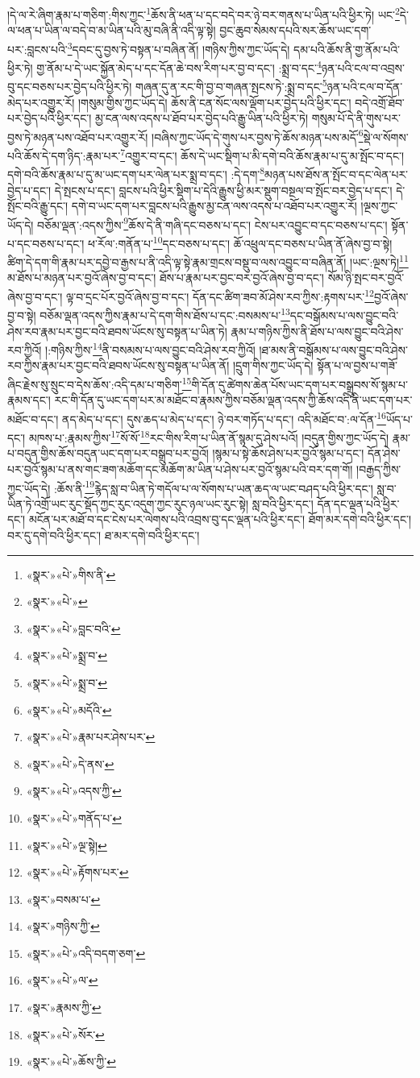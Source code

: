 །དེ་ལ་རེ་ཞིག་རྣམ་པ་གཅིག་:གིས་ཀྱང་\footnote{«སྣར་»«པེ་»གིས་ནི་}ཆོས་ནི་ཕན་པ་དང་བདེ་བར་ཉེ་བར་གནས་པ་ཡིན་པའི་ཕྱིར་ཏེ། ཡང་\footnote{«སྣར་»«པེ་»}དེ་ལ་ཕན་པ་ཡིན་ལ་བདེ་བ་མ་ཡིན་པའི་མུ་བཞི་ནི་འདི་ལྟ་སྟེ། བྱང་ཆུབ་སེམས་དཔའི་སར་ཆོས་ཡང་དག་པར་:བླངས་པའི་\footnote{«སྣར་»«པེ་»བླང་བའི་}དབང་དུ་བྱས་ཏེ་བསྟན་པ་བཞིན་ནོ། །གཉིས་ཀྱིས་ཀྱང་ཡོད་དེ། དམ་པའི་ཆོས་ནི་གྱ་ནོམ་པའི་ཕྱིར་ཏེ། གྱ་ནོམ་པ་དེ་ཡང་སྐྱོན་མེད་པ་དང་དོན་ཆེ་བས་རིག་པར་བྱ་བ་དང་། :སྨྲ་བ་དང་\footnote{«སྣར་»«པེ་»སྨྲ་བ་}ཉན་པའི་ངལ་བ་འབྲས་བུ་དང་བཅས་པར་བྱེད་པའི་ཕྱིར་ཏེ། གཞན་དུ་ན་རང་གི་བྱ་བ་གཞན་སྤངས་ཏེ་:སྨྲ་བ་དང་\footnote{«སྣར་»«པེ་»སྨྲ་བ་}ཉན་པའི་ངལ་བ་དོན་མེད་པར་འགྱུར་རོ། །གསུམ་གྱིས་ཀྱང་ཡོད་དེ། ཆོས་ནི་ངན་སོང་ལས་ལྡོག་པར་བྱེད་པའི་ཕྱིར་དང་། བདེ་འགྲོ་ཐོབ་པར་བྱེད་པའི་ཕྱིར་དང་། མྱ་ངན་ལས་འདས་པ་ཐོབ་པར་བྱེད་པའི་རྒྱུ་ཡིན་པའི་ཕྱིར་ཏེ། གསུམ་པོ་དེ་ནི་གུས་པར་བྱས་ཏེ་མཉན་པས་འཐོབ་པར་འགྱུར་རོ། །བཞིས་ཀྱང་ཡོད་དེ་གུས་པར་བྱས་ཏེ་ཆོས་མཉན་པས་མདོ་\footnote{«སྣར་»«པེ་»མདོའི་}སྡེ་ལ་སོགས་པའི་ཆོས་དེ་དག་ཉིད་:རྣམ་པར་\footnote{«སྣར་»«པེ་»རྣམ་པར་ཤེས་པར་}འགྱུར་བ་དང་། ཆོས་དེ་ཡང་སྡིག་པ་མི་དགེ་བའི་ཆོས་རྣམ་པ་དུ་མ་སྤོང་བ་དང་། དགེ་བའི་ཆོས་རྣམ་པ་དུ་མ་ཡང་དག་པར་ལེན་པར་སྨྲ་བ་དང་། :དེ་དག་\footnote{«སྣར་»«པེ་»དེ་ནས་}མཉན་པས་ཐོས་ན་སྤོང་བ་དང་ལེན་པར་བྱེད་པ་དང་། དེ་སྤངས་པ་དང་། བླངས་པའི་ཕྱིར་སྡིག་པ་དེའི་རྒྱུས་ཕྱི་མར་སྡུག་བསྔལ་བ་སྤོང་བར་བྱེད་པ་དང་། དེ་སྤོང་བའི་རྒྱུ་དང་། དགེ་བ་ཡང་དག་པར་བླངས་པའི་རྒྱུས་མྱ་ངན་ལས་འདས་པ་འཐོབ་པར་འགྱུར་རོ། །ལྔས་ཀྱང་ཡོད་དེ། བཅོམ་ལྡན་:འདས་ཀྱིས་\footnote{«སྣར་»«པེ་»འདས་ཀྱི་}ཆོས་དེ་ནི་གཞི་དང་བཅས་པ་དང་། ངེས་པར་འབྱུང་བ་དང་བཅས་པ་དང་། སྟོན་པ་དང་བཅས་པ་དང་། ཕ་རོལ་:གནོན་པ་\footnote{«སྣར་»«པེ་»གནོད་པ་}དང་བཅས་པ་དང་། ཆོ་འཕྲུལ་དང་བཅས་པ་ཡིན་ནོ་ཞེས་བྱ་བ་སྟེ། ཚིག་དེ་དག་གི་རྣམ་པར་དབྱེ་བ་རྒྱས་པ་ནི་འདི་ལྟ་སྟེ་རྣམ་གྲངས་བསྡུ་བ་ལས་འབྱུང་བ་བཞིན་ནོ། །ཡང་:ལྔས་ཏེ།\footnote{«སྣར་»«པེ་»ལྔ་སྟེ།} མ་ཐོས་པ་མཉན་པར་བྱའོ་ཞེས་བྱ་བ་དང་། ཐོས་པ་རྣམ་པར་བྱང་བར་བྱའོ་ཞེས་བྱ་བ་དང་། སོམ་ཉི་སྤང་བར་བྱའོ་ཞེས་བྱ་བ་དང་། ལྟ་བ་དྲང་པོར་བྱའོ་ཞེས་བྱ་བ་དང་། དོན་དང་ཚིག་ཟབ་མོ་ཤེས་རབ་ཀྱིས་:རྟགས་པར་\footnote{«སྣར་»«པེ་»རྟོགས་པར་}བྱའོ་ཞེས་བྱ་བ་སྟེ། བཅོམ་ལྡན་འདས་ཀྱིས་རྣམ་པ་དེ་དག་གིས་ཐོས་པ་དང་:བསམས་པ་\footnote{«སྣར་»བསམ་པ་}དང་བསྒོམས་པ་ལས་བྱུང་བའི་ཤེས་རབ་རྣམ་པར་བྱང་བའི་ཐབས་ཡོངས་སུ་བསྟན་པ་ཡིན་ཏེ། རྣམ་པ་གཉིས་ཀྱིས་ནི་ཐོས་པ་ལས་བྱུང་བའི་ཤེས་རབ་ཀྱིའོ། །:གཉིས་ཀྱིས་\footnote{«སྣར་»གཉིས་ཀྱི་}ནི་བསམས་པ་ལས་བྱུང་བའི་ཤེས་རབ་ཀྱིའོ། །ཐ་མས་ནི་བསྒོམས་པ་ལས་བྱུང་བའི་ཤེས་རབ་ཀྱིས་རྣམ་པར་བྱང་བའི་ཐབས་ཡོངས་སུ་བསྟན་པ་ཡིན་ནོ། །དྲུག་གིས་ཀྱང་ཡོད་དེ། སྟོན་པ་ལ་བྱས་པ་གཟོ་ཞིང་རྗེས་སུ་སྲུང་བ་དེས་ཆོས་:འདི་དམ་པ་གཅིག་\footnote{«སྣར་»«པེ་»འདི་བདག་ཅག་}གི་དོན་དུ་ཚེགས་ཆེན་པོས་ཡང་དག་པར་བསྒྲུབས་སོ་སྙམ་པ་རྣམས་དང་། རང་གི་དོན་དུ་ཡང་དག་པར་མ་མཐོང་བ་རྣམས་ཀྱིས་བཅོམ་ལྡན་འདས་ཀྱི་ཆོས་འདི་ནི་ཡང་དག་པར་མཐོང་བ་དང་། ནད་མེད་པ་དང་། དུས་ཆད་པ་མེད་པ་དང་། ཉེ་བར་གཏོད་པ་དང་། འདི་མཐོང་བ་:ལ་དོན་\footnote{«སྣར་»«པེ་»ལ་}ཡོད་པ་དང་། མཁས་པ་:རྣམས་ཀྱིས་\footnote{«སྣར་»རྣམས་ཀྱི་}སོ་སོ་\footnote{«སྣར་»«པེ་»སོར་}རང་གིས་རིག་པ་ཡིན་ནོ་སྙམ་དུ་ཤེས་པའོ། །བདུན་གྱིས་ཀྱང་ཡོད་དེ། རྣམ་པ་བདུན་གྱིས་ཆོས་བདུན་ཡང་དག་པར་བསྒྲུབ་པར་བྱའོ། །སྙམ་པ་སྟེ་ཆོས་ཤེས་པར་བྱའོ་སྙམ་པ་དང་། དོན་ཤེས་པར་བྱའོ་སྙམ་པ་ནས་གང་ཟག་མཆོག་དང་མཆོག་མ་ཡིན་པ་ཤེས་པར་བྱའོ་སྙམ་པའི་བར་དག་གོ། །བརྒྱད་ཀྱིས་ཀྱང་ཡོད་དེ། :ཆོས་ནི་\footnote{«སྣར་»«པེ་»ཆོས་ཀྱི་}རྙེད་སླ་བ་ཡིན་ཏེ་གདོལ་པ་ལ་སོགས་པ་ཡན་ཆད་ལ་ཡང་བཤད་པའི་ཕྱིར་དང་། སླ་བ་ཡིན་ཏེ་འགྲོ་ཡང་རུང་སྡོད་ཀྱང་རུང་འདུག་ཀྱང་རུང་ཉལ་ཡང་རུང་སྟེ། སླ་བའི་ཕྱིར་དང་། དོན་དང་ལྡན་པའི་ཕྱིར་དང་། མངོན་པར་མཐོ་བ་དང་ངེས་པར་ལེགས་པའི་འབྲས་བུ་དང་ལྡན་པའི་ཕྱིར་དང་། ཐོག་མར་དགེ་བའི་ཕྱིར་དང་། བར་དུ་དགེ་བའི་ཕྱིར་དང་། ཐ་མར་དགེ་བའི་ཕྱིར་དང་། 
